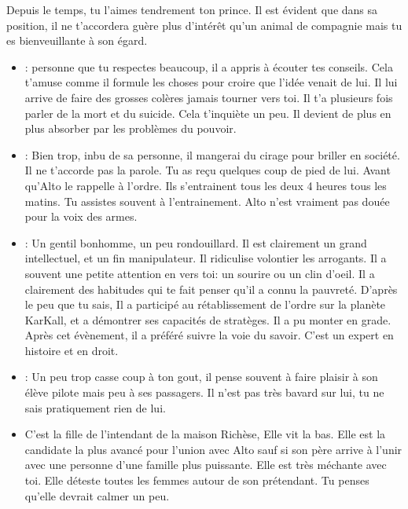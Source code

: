 \documentclass[oneside,12pt]{book}
\begin{document}
\begin{flushleft}
\begin{description}
{ Depuis le temps, tu l'aimes tendrement ton prince.  
Il est évident que dans sa position, il ne t'accordera guère plus d'intérêt qu'un animal de compagnie mais tu es bienveuillante à son égard. 
}
\end{description}
\begin{itemize}
\item[Alto Richèse]: personne que tu respectes beaucoup, il a appris à écouter tes conseils. Cela t'amuse comme il formule les choses pour croire que l'idée venait de lui. Il lui arrive de faire des grosses colères jamais tourner vers toi. Il t'a plusieurs fois parler de la mort et du suicide. Cela t'inquiète un peu. Il devient de plus en plus absorber par les problèmes du pouvoir. 
		\item[Edward Linoilis: le maitre d'armes]: Bien trop, inbu de sa personne, il mangerai du cirage pour briller en société. Il ne t'accorde pas la parole. Tu as reçu quelques coup de pied de lui. Avant qu'Alto le rappelle à l'ordre. Ils s'entrainent tous les deux 4 heures tous les matins. Tu assistes souvent à l'entrainement. Alto n'est vraiment pas douée pour la voix des armes. 
		\item[Penwyr Lanton : le prof particulier]: Un gentil bonhomme, un peu rondouillard. Il est clairement un grand intellectuel, et un fin manipulateur. Il ridiculise volontier les arrogants. Il a souvent une petite attention en vers toi: un sourire ou un clin d'oeil. Il a clairement des habitudes qui te fait penser qu'il a connu la pauvreté. D'après le peu que tu sais, Il a participé au rétablissement de l'ordre sur la planète KarKall, et a démontrer ses capacités de stratèges. Il a pu monter en grade. Après cet évènement, il a préféré suivre la voie du savoir. C'est un expert en histoire et en droit. 
		\item[Octave Siav: Professeur de pilotage ]: Un peu trop casse coup à ton gout, il pense souvent à faire plaisir à son élève pilote mais peu à ses passagers. Il n'est pas très bavard sur lui, tu ne sais pratiquement rien de lui.  
		\item[Alécia Veyron : Courtisanne ] C'est la fille de l'intendant de la maison Richèse, Elle vit la bas. Elle est la candidate la plus avancé pour l'union avec Alto sauf si son père arrive à l'unir avec une personne d'une famille plus puissante. Elle est très méchante avec toi. Elle déteste toutes les femmes autour de son prétendant. Tu penses qu'elle devrait calmer un peu. 
		\end{itemize} 
\clearpage



\end{flushleft}
\end{document}
